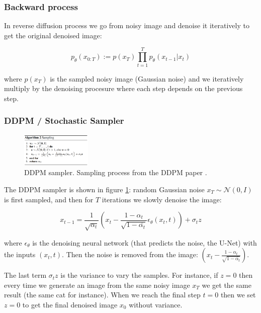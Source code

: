 \subsubsection*{Backward process}

In reverse diffusion process we go from noisy image and denoise it iteratively to get the original denoised image:

\[ p_\theta (x_{0:T}) := p(x_T) \prod_{t=1}^{T} p_\theta (x_{t-1} | x_t) \]

where $p(x_T)$ is the sampled noisy image (Gaussian noise) and we iteratively multiply by the denoising procesure where each step depends on the previous step.









\subsubsection{DDPM / Stochastic Sampler}

\begin{figure}
    \centering
    \includegraphics[width=0.3\textwidth]{images/appendix/dm_samplers/ddpm.png}
    \caption{DDPM sampler. Sampling process from the DDPM paper \cite{ddpm}.}
    \label{fig:appendix_ddpm_sampling}
\end{figure}

The DDPM sampler is shown in figure \ref{fig:appendix_ddpm_sampling}: random Gaussian noise $x_T \sim \mathcal{N} (0, I)$ is first sampled, and then for $T$ iterations we slowly denoise the image:

\[ x_{t-1} = \frac{1}{\sqrt{\alpha_t}} \left( x_t - \frac{1 - \alpha_t}{\sqrt{1 - \bar{\alpha_t}}} \epsilon_\theta (x_t, t) \right) + \sigma_t z \]

where $\epsilon_\theta$ is the denoising neural network (that predicts the noise, the U-Net) with the inputs $(x_t, t)$. Then the noise is removed from the image: $\left( x_t - \frac{1 - \alpha_t}{\sqrt{1 - \bar{\alpha_t}}} \right)$. 

The last term $\sigma_t z$ is the variance to vary the samples. For instance, if $z=0$ then every time we generate an image from the same noisy image $x_T$ we get the same result (the same cat for instance). When we reach the final step $t=0$ then we set $z=0$ to get the final denoised image $x_0$ without variance.







